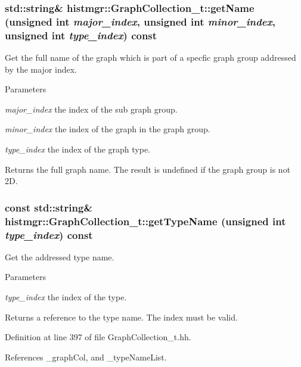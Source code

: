 \subsubsection[{getName}]{\setlength{\rightskip}{0pt plus 5cm}std::string\& histmgr::GraphCollection\_\-t::getName (unsigned int {\em major\_\-index}, \/  unsigned int {\em minor\_\-index}, \/  unsigned int {\em type\_\-index}) const}\label{classhistmgr_1_1GraphCollection__t_a2da46bcaf8e6e11f58b7d0dba88061c8}


Get the full name of the graph which is part of a specfic graph group addressed by the major index. 
\begin{DoxyParams}{Parameters}
\item[{\em major\_\-index}]the index of the sub graph group. \item[{\em minor\_\-index}]the index of the graph in the graph group. \item[{\em type\_\-index}]the index of the graph type. \end{DoxyParams}
\begin{DoxyReturn}{Returns}
the full graph name. The result is undefined if the graph group is not 2D. 
\end{DoxyReturn}
\subsubsection[{getTypeName}]{\setlength{\rightskip}{0pt plus 5cm}const std::string\& histmgr::GraphCollection\_\-t::getTypeName (unsigned int {\em type\_\-index}) const\hspace{0.3cm}{\ttfamily  [inline]}}\label{classhistmgr_1_1GraphCollection__t_aec15ce9e41b61e235c0b017d47974a08}


Get the addressed type name. 
\begin{DoxyParams}{Parameters}
\item[{\em type\_\-index}]the index of the type. \end{DoxyParams}
\begin{DoxyReturn}{Returns}
a reference to the type name. The index must be valid. 
\end{DoxyReturn}


Definition at line 397 of file GraphCollection\_\-t.hh.

References \_\-graphCol, and \_\-typeNameList.
